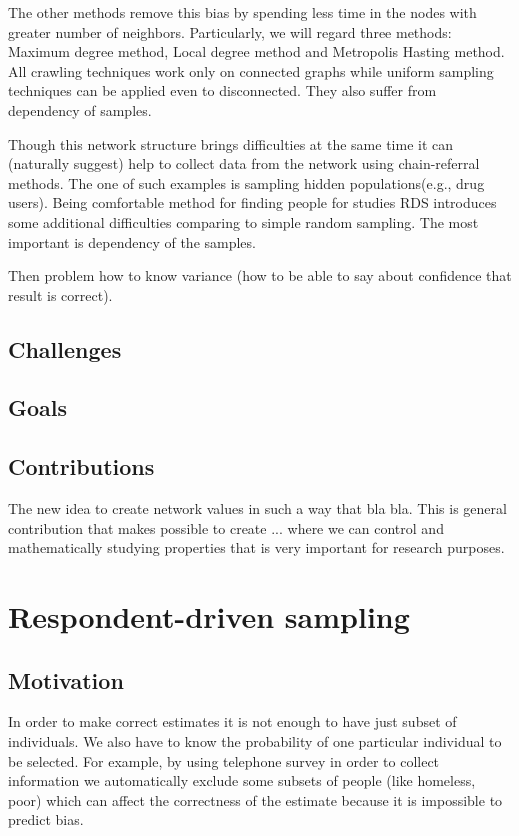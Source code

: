 \documentclass[12pt]{report}
\begin{document}
The other methods remove this bias by spending less time in the nodes with greater number of neighbors. Particularly, we will regard three methods: Maximum degree 
method, Local degree method and Metropolis Hasting method. All crawling techniques work only on connected graphs while uniform sampling techniques can be applied even to disconnected. They also suffer from dependency of samples.

Though this network structure brings difficulties at the same time it can (naturally suggest) help to collect data from the network using chain-referral methods.
The one of such examples is sampling hidden populations(e.g., drug users).
Being comfortable method for finding people for studies RDS introduces some additional difficulties comparing to simple random sampling. The most important is dependency of the samples.

Then problem how to know variance (how to be able to say about confidence that result is correct).


\section{Challenges}



\section{Goals}
\section{Contributions}

The new idea to create network values in such a way that bla bla.
This is general contribution that makes possible to create ... where we can control and mathematically studying properties that is very important for research purposes.

\chapter{Respondent-driven sampling}
\section{Motivation}

In order to make correct estimates it is not enough to have just subset of individuals. We also have to know the probability of one particular individual to be selected. For example, by using telephone survey in order to collect information we automatically exclude some subsets of people (like homeless, poor) which can affect the correctness of the estimate because it is impossible to predict bias. 
\end{document}
